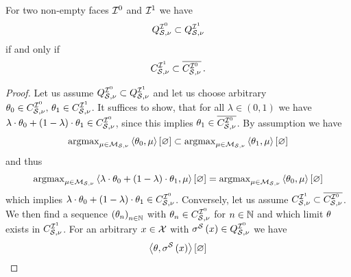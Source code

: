 \begin{lemma}
    \label{lem:faceSetsToMaxCones}
    For two non-empty faces $\mathcal{I}^{0}$ and $\mathcal{I}^{1}$ we have %
    \begin{align*}
        Q^{\mathcal{I}^{0}}_{\mathcal{S},\nu} \subset Q^{\mathcal{I}^{1}}_{\mathcal{S},\nu}
    \end{align*}
    if and only if
    \begin{align*}
        C_{\mathcal{S},\nu}^{\mathcal{I}^{1}} \subset \overline{C_{\mathcal{S},\nu}^{\mathcal{I}^{0}}} \, .
    \end{align*}
\end{lemma}
\begin{proof}
    \proofrightsymbol Let us assume $Q^{\mathcal{I}^{0}}_{\mathcal{S},\nu} \subset Q^{\mathcal{I}^{1}}_{\mathcal{S},\nu}$ and let us choose arbitrary $\theta_{0}\in C_{\mathcal{S},\nu}^{\mathcal{I}^{0}},\,\theta_{1}\in C_{\mathcal{S},\nu}^{\mathcal{I}^{1}}$.
    It suffices to show, that for all $\lambda\in(0,1)$ we have $\lambda\cdot\theta_{0}+(1-\lambda)\cdot\theta_{1}\in C_{\mathcal{S},\nu}^{\mathcal{I}^{0}}$, since this implies $\theta_{1}\in\overline{C_{\mathcal{S},\nu}^{\mathcal{I}^{0}}}$.
    By assumption we have
    \begin{align*}
        \mathrm{argmax}_{\mu\in\mathcal{M}_{\mathcal{S},\nu}} \left\langle \theta_{0},\mu\right\rangle \left[ \varnothing \right] \subset  \mathrm{argmax}_{\mu\in\mathcal{M}_{\mathcal{S},\nu}} \left\langle \theta_{1},\mu\right\rangle \left[ \varnothing \right]
    \end{align*}
    and thus
    \begin{align*}
        \mathrm{argmax}_{\mu\in\mathcal{M}_{\mathcal{S},\nu}} \left\langle \lambda\cdot\theta_{0}+(1-\lambda)\cdot\theta_{1},\mu\right\rangle \left[ \varnothing \right] = \mathrm{argmax}_{\mu\in\mathcal{M}_{\mathcal{S},\nu}} \left\langle \theta_{0},\mu\right\rangle \left[ \varnothing \right]
    \end{align*}
    which implies $\lambda\cdot\theta_{0}+(1-\lambda)\cdot\theta_{1}\in C_{\mathcal{S},\nu}^{\mathcal{I}^{0}}$.
    \proofleftsymbol Conversely, let us assume $C_{\mathcal{S},\nu}^{\mathcal{I}^{1}} \subset \overline{C_{\mathcal{S},\nu}^{\mathcal{I}^{0}}}$.
    We then find a sequence $\left(\theta_{n}\right)_{n\in\mathbb{N}}$ with $\theta_{n}\in C_{\mathcal{S},\nu}^{\mathcal{I}^{0}}$ for $n\in\mathbb{N}$ and which limit $\theta$ exists in $C_{\mathcal{S},\nu}^{\mathcal{I}^{1}}$.
    For an arbitrary $x\in\mathcal{X}$ with $\sigma^{\mathcal{S}}\left(x\right)\in Q^{\mathcal{I}^{0}}_{\mathcal{S},\nu}$ we have
    \begin{align*}
        \contraction{\canparam,\sstatencodingat{\catindex}}

\end{align*}
\end{proof}
